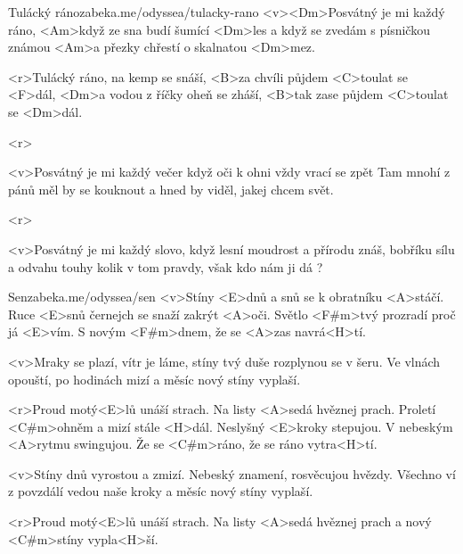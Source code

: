 \begin{song}[Nedvědi]{31}{Tulácký ráno}{zabeka.me/odyssea/tulacky-rano}
	<v><Dm>Posvátný je mi každý ráno,
	<Am>když ze sna budí šumící <Dm>les
	a když se zvedám s písničkou známou
	<Am>a přezky chřestí o skalnatou <Dm>mez.

	<r>Tulácký ráno, na kemp se snáší,
	<B>za chvíli půjdem <C>toulat se <F>dál,
	<Dm>a vodou z říčky oheň se zháší,
	<B>tak zase půjdem <C>toulat se <Dm>dál.

	<r>

	<v>Posvátný je mi každý večer
	když oči k ohni vždy vrací se zpět
	Tam mnohí z pánů měl by se kouknout
	a hned by viděl, jakej chcem svět.

	<r>

	<v>Posvátný je mi každý slovo,
	když lesní moudrost a přírodu znáš,
	bobříku sílu a odvahu touhy
	kolik v tom pravdy, však kdo nám ji dá ?
\end{song}
\begin{song}[Lucie]{32}{Sen}{zabeka.me/odyssea/sen}
	<v>Stíny <E>dnů a snů se k obratníku <A>stáčí.
	Ruce <E>snů černejch se snaží zakrýt <A>oči.
	Světlo <F#m>tvý prozradí proč já <E>vím.
	S novým <F#m>dnem, že se <A>zas navrá<H>tí.

	<v>Mraky se plazí, vítr je láme,
	stíny tvý duše rozplynou se v šeru.
	Ve vlnách opouští, po hodinách mizí
	a měsíc nový stíny vyplaší.

	<r>Proud motý<E>lů unáší strach.
	Na listy <A>sedá hvěznej prach.
	Proletí <C#m>ohněm a mizí stále <H>dál.
	Neslyšný <E>kroky stepujou.
	V nebeským <A>rytmu swingujou.
	Že se <C#m>ráno, že se ráno vytra<H>tí.

	<v>Stíny dnů vyrostou a zmizí.
	Nebeský znamení, rosvěcujou hvězdy.
	Všechno ví z povzdálí vedou naše kroky
	a měsíc nový stíny vyplaší.

	<r>Proud motý<E>lů unáší strach.
	Na listy <A>sedá hvěznej prach
	a nový <C#m>stíny vypla<H>ší.
\end{song}
